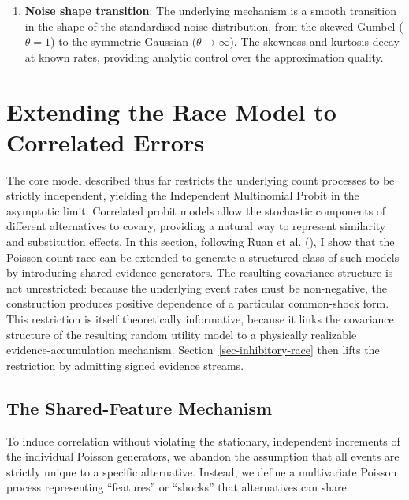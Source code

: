 \documentclass[
  man,
  floatsintext,
  longtable,
  a4paper,
  nolmodern,
  notxfonts,
  notimes,
  colorlinks=true,linkcolor=blue,citecolor=blue,urlcolor=blue]{apa7}
\begin{document}
\begin{enumerate}
  is small. This cross-over in parameter invariance provides a
  process-level account of the empirical findings of
  ():
  parameter stability across \(K\) is diagnostic of whether the
  effective noise distribution is closer to Gumbel or Gaussian.
\item
  \textbf{Noise shape transition}: The underlying mechanism is a smooth
  transition in the shape of the standardised noise distribution, from
  the skewed Gumbel (\(\theta = 1\)) to the symmetric Gaussian
  (\(\theta \to \infty\)). The skewness and kurtosis decay at known
  rates, providing analytic control over the approximation quality.
\end{enumerate}

\section{Extending the Race Model to Correlated
Errors}\label{sec-correlated-errors}

The core model described thus far restricts the underlying count
processes to be strictly independent, yielding the Independent
Multinomial Probit in the asymptotic limit. Correlated probit models
allow the stochastic components of different alternatives to covary,
providing a natural way to represent similarity and substitution
effects. In this section, following Ruan et al.
(), I show that the
Poisson count race can be extended to generate a structured class of
such models by introducing shared evidence generators. The resulting
covariance structure is not unrestricted: because the underlying event
rates must be non-negative, the construction produces positive
dependence of a particular common-shock form. This restriction is itself
theoretically informative, because it links the covariance structure of
the resulting random utility model to a physically realizable
evidence-accumulation mechanism. Section~\ref{sec-inhibitory-race} then
lifts the restriction by admitting signed evidence streams.

\subsection{The Shared-Feature
Mechanism}\label{the-shared-feature-mechanism}

To induce correlation without violating the stationary, independent
increments of the individual Poisson generators, we abandon the
assumption that all events are strictly unique to a specific
alternative. Instead, we define a multivariate Poisson process
representing ``features'' or ``shocks'' that alternatives can share.
\end{document}
